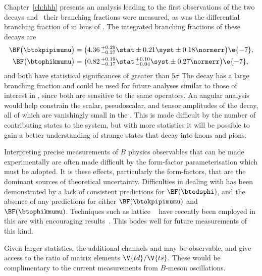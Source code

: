
Chapter~\ref{ch:hhh} presents an analysis leading to the first observations of the two decays
\btokpipimumu and \btophikmumu\, their branching fractions were measured, as was the differential
branching fraction of \btokpipimumu in bins of \qsq.
The integrated branching fractions of these decays are
\begin{align*}
  \BF\big( \btokpipimumu \big)&=
  \big(4.36\,^{+0.29}_{-0.27}\stat\pm0.21\syst\pm0.18\normerr\big)\e{-7}, \\
  \BF\big(\btophikmumu\big)&=
  \big(0.82\,^{+0.19}_{-0.17}\stat\,^{+0.10}_{-0.04}\syst\pm0.27\normerr\big)\e{-7},
\end{align*}
and both have statistical significances of greater than $5\sigma$
The decay \btokpipimumu has a large branching fraction and could be used for future analyses
similar to those of interest in \btokstrmumu, since both are sensitive to the same operators.
An angular analysis would help constrain the scalar, pseudoscalar, and tensor amplitudes of the
decay, all of which are vanishingly small in the \sm.
This is made difficult by the number of contributing states to the \kpipi system,
but with more statistics it will be possible to gain a better understanding of
strange states that decay into kaons and pions.

Interpreting precise measurements of $B$ physics observables that can be made
experimentally are often made difficult by the form-factor parameterisation which must be adopted.
It is these \QCD effects, particularly the form-factors, that are the dominant sources of
theoretical uncertainty.
Difficulties in dealing with \QCD has been demonstrated by a lack of consistent predictions for
$\BF(\btodsphi)$, and the absence of any predictions for either $\BF(\btokpipimumu)$ and
$\BF(\btophikmumu)$.
Techniques such as lattice \QCD~\cite{Bouchard:2013pna} have recently been employed in this are
with encouraging results~\cite{RotheLattice}.
This bodes well for future measurements of this kind.



Given larger statistics, the additional channels \decay{\Bp}{\Kp\Km\pip\mumu} and
\decay{\Bp}{\pip\pipi\mumu}
may be observable, and give access to the ratio of \ckm matrix elements $\V{td}/\V{ts}$.
These would be complimentary to the current
measurements from $B$-meson oscillations.

